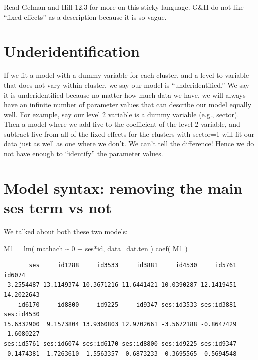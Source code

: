 \documentclass[
  letterpaper,
  DIV=11,
  numbers=noendperiod]{scrreprt}
\newenvironment{Shaded}{\begin{snugshade}}{\end{snugshade}}
\newcommand{\AttributeTok}[1]{\textcolor[rgb]{0.49,0.56,0.16}{#1}}
\newcommand{\DecValTok}[1]{\textcolor[rgb]{0.25,0.63,0.44}{#1}}
\newcommand{\FunctionTok}[1]{\textcolor[rgb]{0.02,0.16,0.49}{#1}}
\newcommand{\NormalTok}[1]{\textcolor[rgb]{0.00,0.44,0.13}{#1}}
\newcommand{\OtherTok}[1]{\textcolor[rgb]{0.00,0.44,0.13}{#1}}
\newcommand{\SpecialCharTok}[1]{\textcolor[rgb]{0.25,0.44,0.63}{#1}}
\begin{document}
Read Gelman and Hill 12.3 for more on this sticky language. G\&H do not
like ``fixed effects'' as a description because it is so vague.

\hypertarget{underidentification}{%
\section{Underidentification}\label{underidentification}}

If we fit a model with a dummy variable for each cluster, and a level to
variable that does not vary within cluster, we say our model is
``underidentified.'' We say it is underidentified because no matter how
much data we have, we will always have an infinite number of parameter
values that can describe our model equally well. For example, say our
level 2 variable is a dummy variable (e.g., sector). Then a model where
we add five to the coefficient of the level 2 variable, and subtract
five from all of the fixed effects for the clusters with sector=1 will
fit our data just as well as one where we don't. We can't tell the
difference! Hence we do not have enough to ``identify'' the parameter
values.

\hypertarget{model-syntax-removing-the-main-ses-term-vs-not}{%
\section{Model syntax: removing the main ses term vs
not}\label{model-syntax-removing-the-main-ses-term-vs-not}}

We talked about both these two models:

\begin{Shaded}
\begin{Highlighting}[]
\NormalTok{M1 }\OtherTok{=} \FunctionTok{lm}\NormalTok{( mathach }\SpecialCharTok{\textasciitilde{}} \DecValTok{0} \SpecialCharTok{+}\NormalTok{ ses}\SpecialCharTok{*}\NormalTok{id, }\AttributeTok{data=}\NormalTok{dat.ten )}
\FunctionTok{coef}\NormalTok{( M1 )}
\end{Highlighting}
\end{Shaded}

\begin{verbatim}
       ses     id1288     id3533     id3881     id4530     id5761     id6074 
 3.2554487 13.1149374 10.3671216 11.6441421 10.0390287 12.1419451 14.2022643 
    id6170     id8800     id9225     id9347 ses:id3533 ses:id3881 ses:id4530 
15.6332900  9.1573804 13.9360803 12.9702661 -3.5672188 -0.8647429 -1.6080227 
ses:id5761 ses:id6074 ses:id6170 ses:id8800 ses:id9225 ses:id9347 
-0.1474381 -1.7263610  1.5563357 -0.6873233 -0.3695565 -0.5694548 
\end{verbatim}
\end{document}
